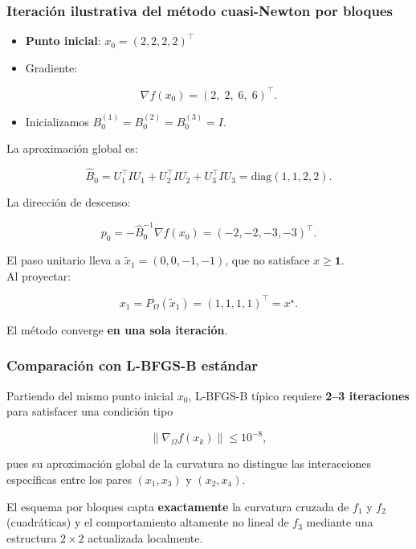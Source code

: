 \documentclass[
  spanish,
  us-letterpaper,
  DIV=11,
  numbers=noendperiod]{scrreprt}
\providecommand{\tightlist}{%
  \setlength{\itemsep}{0pt}\setlength{\parskip}{0pt}}
\numberwithin{equation}{section}
\begin{document}
\subsubsection{Iteración ilustrativa del método cuasi-Newton por
bloques}\label{iteraciuxf3n-ilustrativa-del-muxe9todo-cuasi-newton-por-bloques}

\begin{itemize}
\tightlist
\item
  \textbf{Punto inicial}: \(x_0=(2,2,2,2)^\top\)\\
\item
  Gradiente:
\end{itemize}

\[
\nabla f(x_0)=(2,\;2,\;6,\;6)^\top.
\]

\begin{itemize}
\tightlist
\item
  Inicializamos \(B_0^{(1)}=B_0^{(2)}=B_0^{(3)}=I\).
\end{itemize}

La aproximación global es:

\[
\widehat{B}_0 = U_1^\top I U_1 + U_2^\top I U_2 + U_3^\top I U_3
= \mathrm{diag}(1,1,2,2).
\]

La dirección de descenso:

\[
p_0 = -\widehat{B}_0^{-1}\nabla f(x_0)
= (-2,-2,-3,-3)^\top.
\]

El paso unitario lleva a \(\tilde{x}_1=(0,0,-1,-1)\), que no satisface
\(x\ge\mathbf{1}\).\\
Al proyectar:

\[
x_1 = P_\Omega(\tilde{x}_1) = (1,1,1,1)^\top = x^\star.
\]

El método converge \textbf{en una sola iteración}.

\subsubsection{Comparación con L-BFGS-B
estándar}\label{comparaciuxf3n-con-l-bfgs-b-estuxe1ndar}

Partiendo del mismo punto inicial \(x_0\), L-BFGS-B típico requiere
\textbf{2--3 iteraciones} para satisfacer una condición tipo

\[
\|\nabla_\Omega f(x_k)\|\le 10^{-8},
\]

pues su aproximación global de la curvatura no distingue las
interacciones específicas entre los pares \((x_1,x_3)\) y \((x_2,x_4)\).

El esquema por bloques capta \textbf{exactamente} la curvatura cruzada
de \(f_1\) y \(f_2\) (cuadráticas) y el comportamiento altamente no
lineal de \(f_3\) mediante una estructura \(2\times2\) actualizada
localmente.
\end{document}

